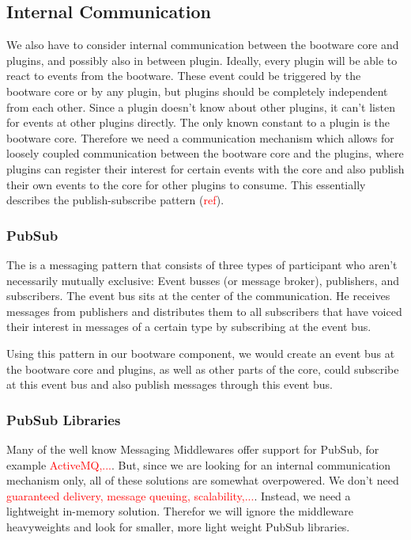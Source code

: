 \subsection{Internal Communication}

We also have to consider internal communication between the bootware core and plugins, and possibly also in between plugin.
Ideally, every plugin will be able to react to events from the bootware.
These event could be triggered by the bootware core or by any plugin, but plugins should be completely independent from each other.
Since a plugin doesn't know about other plugins, it can't listen for events at other plugins directly.
The only known constant to a plugin is the bootware core.
Therefore we need a communication mechanism which allows for loosely coupled communication between the bootware core and the plugins, where plugins can register their interest for certain events with the core and also publish their own events to the core for other plugins to consume.
This essentially describes the publish-subscribe pattern (\textcolor{red}{ref}).

\subsubsection{PubSub}

The  is a messaging pattern that consists of three types of participant who aren't necessarily mutually exclusive: Event busses (or message broker), publishers, and subscribers.
The event bus sits at the center of the communication.
He receives messages from publishers and distributes them to all subscribers that have voiced their interest in messages of a certain type by subscribing at the event bus.

Using this pattern in our bootware component, we would create an event bus at the bootware core and plugins, as well as other parts of the core, could subscribe at this event bus and also publish messages through this event bus.

\subsubsection{PubSub Libraries}

Many of the well know Messaging Middlewares offer support for PubSub, for example \textcolor{red}{ActiveMQ,...}.
But, since we are looking for an internal communication mechanism only, all of these solutions are somewhat overpowered.
We don't need \textcolor{red}{guaranteed delivery, message queuing, scalability,...}.
Instead, we need a lightweight in-memory solution.
Therefor we will ignore the middleware heavyweights and look for smaller, more light weight PubSub libraries.


